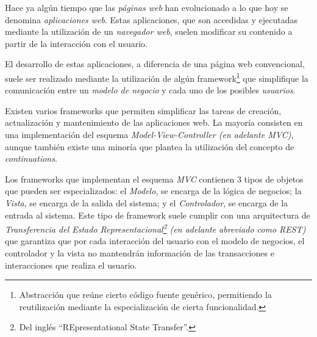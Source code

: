 


Hace ya algún tiempo que las \emph{páginas web} han evolucionado a lo que hoy se denomina \emph{aplicaciones web}. Estas aplicaciones, que son accedidas y ejecutadas mediante la utilización de un \emph{navegador web}, suelen modificar su contenido a partir de la interacción con el usuario.

El desarrollo de estas aplicaciones, a diferencia de una página web convencional, suele ser realizado mediante la utilización de algún framework\footnote{Abstracción que reúne cierto código fuente genérico, permitiendo la reutilización mediante la especialización de cierta funcionalidad.} que simplifique la comunicación entre un \emph{modelo de negocio} y cada uno de los posibles \emph{usuarios}.

Existen varios frameworks que permiten simplificar las tareas de creación, actualización y mantenimiento de las aplicaciones web. La mayoría consisten en una implementación del esquema \emph{Model-View-Controller\cite{Krasner88,Gamma95} (en adelante MVC)}, aunque también existe una minoría que plantea la utilización del concepto de \emph{continuations}.

Los frameworks que implementan el esquema \emph{MVC} contienen 3 tipos de objetos que pueden ser especializados: el \emph{Modelo}, se encarga de la lógica de negocios; la \emph{Vista}, se encarga de la salida del sistema; y el \emph{Controlador}, se encarga de la entrada al sistema. Este tipo de framework suele cumplir con una arquitectura de \emph{Transferencia del Estado Representacional\footnote{Del inglés ``REpresentational State Transfer''.} (en adelante abreviado como REST)} que garantiza que por cada interacción del usuario con el modelo de negocios, el controlador y la vista no mantendrán información de las transacciones e interacciones que realiza el usuario.

